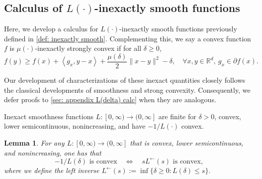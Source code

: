 \documentclass[11pt, hidelinks]{article}
\numberwithin{equation}{section}
\theoremstyle{thmstyletwo}%
\newtheorem{lemma}[thm]{Lemma}
\numberwithin{equation}{section}
\newcommand{\inner}[2]{\left\langle {#1}, {#2} \right\rangle}
\newcommand{\Lleft}{L^{\leftarrow}}
\begin{document}
\subsection{Calculus of $L(\cdot)$-inexactly smooth functions}\label{subsec:calculus}

Here, we develop a calculus for $L(\cdot)$-inexactly smooth functions previously defined in \eqref{def: inexactly smooth}.
Complementing this, we say a convex function $f$ is $\mu(\cdot)$-inexactly strongly convex if for all $\delta\geq 0$,
\begin{equation}\label{def: inexactly mu strong convexity}
    f(y) \geq f(x) + \inner{g_x}{y-x} + \frac{\mu(\delta)}{2}\|x-y\|^2 - \delta, \quad \forall x, y \in \mathbb{R}^d,\ g_x\in\partial f(x).
\end{equation}


Our development of characterizations of these inexact quantities closely follows the classical developments of smoothness and strong convexity. Consequently, we defer proofs to \cref{sec: appendix L(delta) calc} when they are analogous. 


 Inexact smoothness functions $L \colon [0,\infty) \to (0, \infty]$ are finite for $\delta > 0$, convex, lower semicontinuous, nonincreasing, and have $-1/L(\cdot)$ convex. 

\begin{lemma}\label{lemma:equivalences-of-convexity-assumptions}
    For any $L \colon [0,\infty) \to (0, \infty]$ that is convex, lower semicontinuous, and nonincreasing, one has that
    $$ -1/L(\delta)\text{ is convex} \quad \iff \quad s \Lleft(s) \text{ is convex},$$
    where we define the left inverse $ \Lleft(s) := \inf\{\delta  \geq 0 : L(\delta) \leq s\}. $
\end{lemma}
\end{document}
